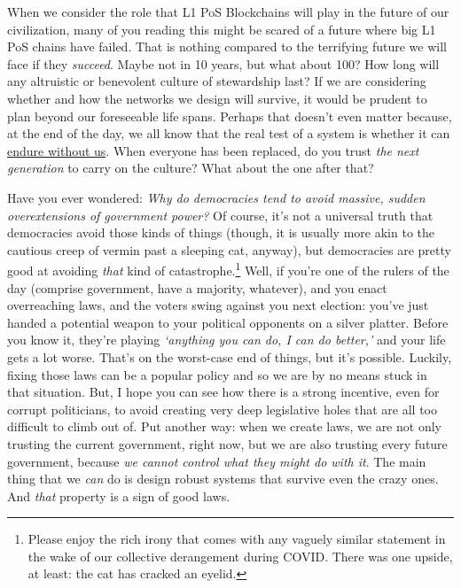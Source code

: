 When we consider the role that L1 PoS Blockchains will play in the future of our civilization, many of you reading this might be scared of a future where big L1 PoS chains have failed.
That is nothing compared to the terrifying future we will face if they \emph{succeed}.
Maybe not in 10 years, but what about 100?
How long will any altruistic or benevolent culture of stewardship last?
If we are considering whether and how the networks we design will survive, it would be prudent to plan beyond our foreseeable life spans.
Perhaps that doesn't even matter because, at the end of the day, we all know that the real test of a system is whether it can \ul{endure without us}.
When everyone has been replaced, do you trust \emph{the next generation} to carry on the culture?
What about the one after that?

Have you ever wondered: \emph{Why do democracies tend to avoid massive, sudden overextensions of government power?}
Of course, it's not a universal truth that democracies avoid those kinds of things (though, it is usually more akin to the cautious creep of vermin past a sleeping cat, anyway),
but democracies are pretty good at avoiding \emph{that} kind of catastrophe.\footnote{
  Please enjoy the rich irony that comes with any vaguely similar statement in the wake of our collective derangement during COVID.
  There was one upside, at least: the cat has cracked an eyelid.
}
Well, if you're one of the rulers of the day (comprise government, have a majority, whatever), and you enact overreaching laws, and the voters swing against you next election: you've just handed a potential weapon to your political opponents on a silver platter.
Before you know it, they're playing \emph{`anything you can do, I can do better,'} and your life gets a lot worse.
That's on the worst-case end of things, but it's possible.
Luckily, fixing those laws can be a popular policy and so we are by no means stuck in that situation.
But, I hope you can see how there is a strong incentive, even for corrupt politicians, to avoid creating very deep legislative holes that are all too difficult to climb out of.
Put another way: when we create laws, we are not only trusting the current government, right now, but we are also trusting every future government, because \emph{we cannot control what they might do with it}.
The main thing that we \emph{can} do is design robust systems that survive even the crazy ones.
And \emph{that} property is a sign of good laws.

